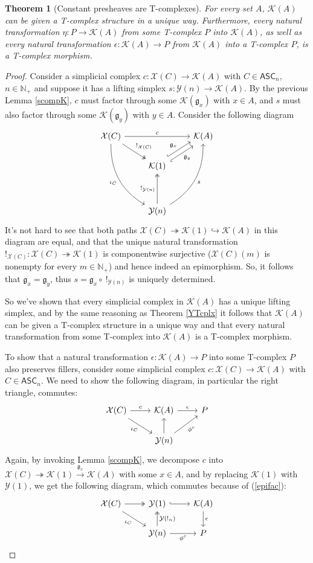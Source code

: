 \documentclass{article}
\newtheorem{theorem}{Theorem}[subsection]
\theoremstyle{remark}
\theoremstyle{definition}
\newcommand{\N}{\mathbb N}
\newcommand{\ASC}{\mathsf{ASC}}
\newcommand{\Y}{\mathcal Y}
\newcommand{\X}{\mathcal X}
\newcommand{\K}{\mathcal K}
\newcommand{\g}{\mathfrak g}
\begin{document}
	\begin{theorem}[Constant presheaves are T-complexes]\label{KTcplx}
		For every set $A$, $\K(A)$ can be given a T-complex structure in a unique way. Furthermore, every natural transformation $\eta:P\to\K(A)$ from some T-complex $P$ into $\K(A)$, as well as every natural transformation $\epsilon:\K(A)\to P$ from $\K(A)$ into a T-complex $P$, is a T-complex morphism.
	\end{theorem}
	\begin{proof}
		Consider a simplicial complex $c:\X(C)\to\K(A)$ with $C\in\ASC_n$, $n\in\N_+$ and suppose it has a lifting simplex $s:\Y(n)\to\K(A)$. By the previous Lemma \ref{scompK}, $c$ must factor through some $\K(\g_x)$ with $x\in A$, and $s$ must also factor through some $\K(\g_y)$ with $y\in A$. Consider the following diagram
		\[\begin{tikzcd}
			\X(C)\arrow{rr}{c}\arrow[two heads]{dr}{!_{\X(C)}}\arrow[bend right=30]{dddr}[swap]{\iota_C}&&\K(A)\\
			&\K(1)\arrow[hook,shift left=1mm]{ur}{\g_x}\arrow[hook',shift right=1mm]{ur}[swap]{\g_y}\\\\
			&\Y(n)\arrow[two heads]{uu}{!_{\Y(n)}}\arrow[bend right=30]{uuur}[swap]{s}
		\end{tikzcd}\]
		It's not hard to see that both paths $\X(C)\twoheadrightarrow\K(1)\hookrightarrow\K(A)$ in this diagram are equal, and that the unique natural transformation $!_{\X(C)}:\X(C)\twoheadrightarrow\K(1)$ is componentwise surjective ($\X(C)(m)$ is nonempty for every $m\in\N_+$) and hence indeed an epimorphism. So, it follows that $\g_x=\g_y$, thus $s=\g_x\circ\ !_{\Y(n)}$ is uniquely determined.
		
		So we've shown that every simplicial complex in $\K(A)$ has a unique lifting simplex, and by the same reasoning as Theorem \ref{YTcplx} it follows that $\K(A)$ can be given a T-complex structure in a unique way and that every natural transformation from some T-complex into $\K(A)$ is a T-complex morphism.
		
		To show that a natural transformation $\epsilon:\K(A)\to P$ into some T-complex $P$ also preserves fillers, consider some simplicial complex $c:\X(C)\to\K(A)$ with $C\in\ASC_n$. We need to show the following diagram, in particular the right triangle, commutes:
		\[\begin{tikzcd}
			\X(C)\arrow{r}{c}\arrow{dr}[swap]{\iota_C}&\K(A)\arrow{r}{\epsilon}&P\\
			&\Y(n)\arrow{u}\arrow{ur}[swap]{\phi^c}
		\end{tikzcd}\]
		Again, by invoking Lemma \ref{scompK}, we decompose $c$ into $\X(C)\twoheadrightarrow\K(1)\xrightarrow{\g_x}\K(A)$ with some $x\in A$, and by replacing $\K(1)$ with $\Y(1)$, we get the following diagram, which commutes because of (\ref{epifac}):
		\[\begin{tikzcd}
			\X(C)\arrow[two heads]{r}\arrow{dr}[swap]{\iota_C}&\Y(1)\arrow[hook]{r}&\K(A)\arrow{d}{\epsilon}\\
			&\Y(n)\arrow[two heads]{u}[swap]{\Y(!_n)}\arrow{r}[swap]{\phi^c}&P
		\end{tikzcd}\]
	\end{proof}
\end{document}
